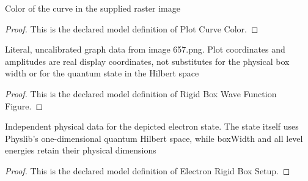 \begin{definition}
  \label{def:physics:phyx-mini-0657:phyxminiproblems-problemphyxmini0657-plotcurvecolor}
  Color of the curve in the supplied raster image
\end{definition}
\begin{proof}
  This is the declared model definition of Plot Curve Color.
\end{proof}
\begin{definition}
  \label{def:physics:phyx-mini-0657:phyxminiproblems-problemphyxmini0657-rigidboxwavefunctionfigure}
  Literal, uncalibrated graph data from image 657.png. Plot coordinates and amplitudes are real display coordinates, not substitutes for the physical box width or for the quantum state in the Hilbert space
\end{definition}
\begin{proof}
  This is the declared model definition of Rigid Box Wave Function Figure.
\end{proof}
\begin{definition}
  \label{def:physics:phyx-mini-0657:phyxminiproblems-problemphyxmini0657-electronrigidboxsetup}
  Independent physical data for the depicted electron state. The state itself uses Physlib's one-dimensional quantum Hilbert space, while boxWidth and all level energies retain their physical dimensions
\end{definition}
\begin{proof}
  This is the declared model definition of Electron Rigid Box Setup.
\end{proof}
